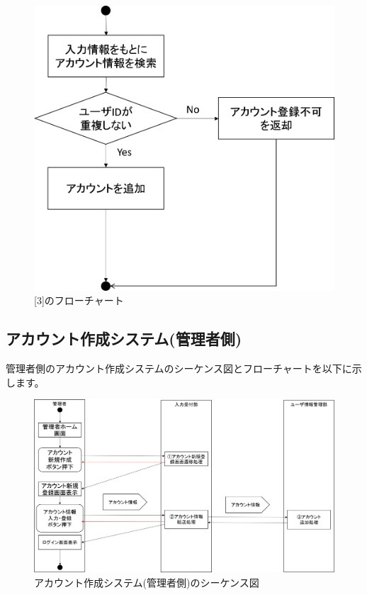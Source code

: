 \begin{figure}[htbp]
  \begin{center}
    \includegraphics[width=0.5\linewidth,clip]{./img/create_account/sub3.png}
    \caption{[3]のフローチャート}\label{fig:createaccountflow1}
  \end{center}
\end{figure}

\newpage
\subsection{アカウント作成システム(管理者側)}
管理者側のアカウント作成システムのシーケンス図とフローチャートを以下に示します。

\begin{figure}[htbp]
  \begin{center}
    \includegraphics[width=1\linewidth,clip]{./img/admin_create_account/main.png}
    \caption{アカウント作成システム(管理者側)のシーケンス図}\label{fig:admincreateseaquence}
  \end{center}
\end{figure}

